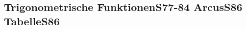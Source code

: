 		\subsection{Trigonometrische Funktionen\color{red}S77-84 \color{black} Arcus\color{red}S86 \smallskip \color{black} Tabelle\color{red}S86}
			
%		   
%			
%			
%
			\hspace{0pt}
